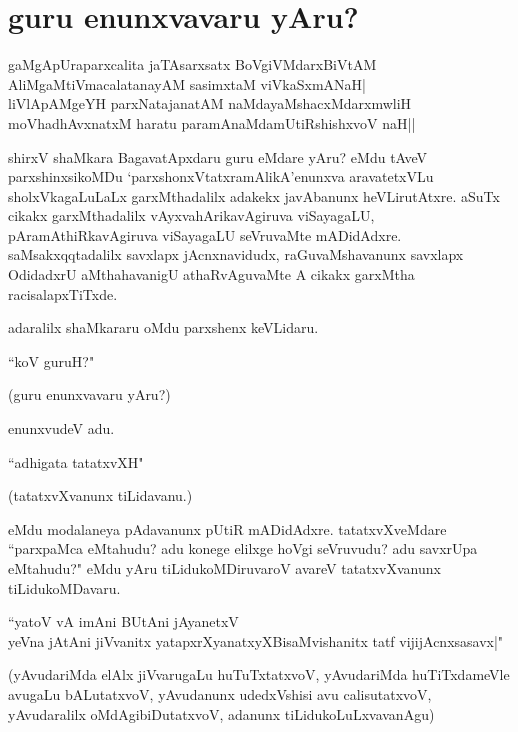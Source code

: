 \chapter{guru enunxvavaru yAru?}\label{chap12}

\begin{shloka}
gaMgApUraparxcalita jaTAsarxsatx BoVgiVMdarxBiVtAM\\
AliMgaMtiVmacalatanayAM sasimxtaM viVkaSxmANaH|\\
liVlApAMgeYH parxNatajanatAM naMdayaMshacxMdarxmwliH\\
moVhadhAvxnatxM haratu paramAnaMdamUtiRshishxvoV naH||
\end{shloka}

shirxV shaMkara BagavatApxdaru guru eMdare yAru? eMdu tAveV parxshinxsikoMDu `parxshonxVtatxramAlikA'enunxva aravatetxVLu sholxVkagaLuLaLx garxMthadalilx adakekx javAbanunx heVLirutAtxre. aSuTx cikakx garxMthadalilx vAyxvahArikavAgiruva viSayagaLU, pAramAthiRkavAgiruva viSayagaLU seVruvaMte mADidAdxre. saMsakxqqtadalilx savxlapx jAcnxnavidudx, raGuvaMshavanunx savxlapx OdidadxrU aMthahavanigU athaRvAguvaMte A cikakx garxMtha racisalapxTiTxde. 

adaralilx shaMkararu oMdu parxshenx keVLidaru.

\begin{shloka}
``koV guruH?"
\end{shloka}

(guru enunxvavaru yAru?)

enunxvudeV adu. 

\begin{shloka}
``adhigata tatatxvXH"
\end{shloka}

(tatatxvXvanunx tiLidavanu.)

eMdu modalaneya pAdavanunx pUtiR mADidAdxre. tatatxvXveMdare ``parxpaMca eMtahudu? adu konege elilxge hoVgi seVruvudu? adu savxrUpa eMtahudu?" eMdu yAru tiLidukoMDiruvaroV avareV tatatxvXvanunx tiLidukoMDavaru. 

\begin{shloka}
``yatoV vA imAni BUtAni jAyanetxV\\
yeVna jAtAni jiVvanitx yatapxrXyanatxyXBisaMvishanitx tatf vijijAcnxsasavx|"
\end{shloka}

(yAvudariMda elAlx jiVvarugaLu huTuTxtatxvoV, yAvudariMda huTiTxdameVle avugaLu bALutatxvoV, yAvudanunx udedxVshisi avu calisutatxvoV, yAvudaralilx oMdAgibiDutatxvoV, adanunx tiLidukoLuLxvavanAgu)

